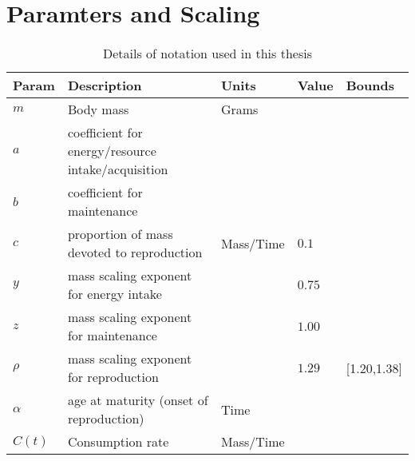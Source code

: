 \documentclass[a4paper]{article} %
\begin{document}
\section{Paramters and Scaling}
\begin{table}[H]
    \caption{Details of notation used in this thesis}
    \begin{tabularx}{\linewidth}{|l|X|l|X|l|}
    \hline
    Param               & Description                                                       & Units                     & Value                                         & Bounds        \\ \hline
    $m$                 & Body mass                                                         & Grams                     &                                               &               \\ \hline
    $a$                 & coefficient for energy/resource intake/acquisition                &                           &                                               &               \\ \hline
    $b$                 & coefficient for maintenance                                       &                           &                                               &               \\ \hline
    $c$                 & proportion of mass devoted to reproduction                        & Mass/Time                 & $0.1$ \autocite{peters1983,Blueweiss1978}     &                \\ \hline
    $y$                 & mass scaling exponent for energy intake                           &                           & $0.75$                                        &               \\ \hline
    $z$                 & mass scaling exponent for maintenance                             &                           & $1.00$                                        &               \\ \hline
    $\rho$              & mass scaling exponent for reproduction                            &                           & $1.29$ \autocite{Barneche2018d}               & [1.20,1.38]   \\ \hline
    $\alpha$            & age at maturity (onset of reproduction)                           & Time                      &                                               &               \\ \hline
    $C(t)$              & Consumption rate                                                  & Mass/Time                 &                                               &               \\ \hline

\end{tabularx}
\end{table}
\end{document}
